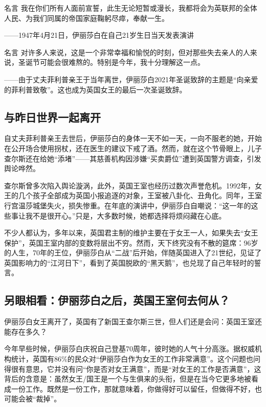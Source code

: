 \begin{quoteBox}{名言}
我在你们所有人面前宣誓，此生无论短暂或漫长，我都将会为英联邦的全体人民、为我们同属的帝国家庭鞠躬尽瘁，奉献一生。

——1947年4月21日，伊丽莎白在自己21岁生日当天发表演讲
\end{quoteBox}

\begin{quoteBox}{名言}
对许多人来说，这是一个非常幸福和愉悦的时刻，但对那些失去亲人的人来说，圣诞节可能会很难熬的。特别是今年，我十分理解这一点。

——由于丈夫菲利普亲王于当年离世，伊丽莎白2021年圣诞致辞的主题是“向亲爱的菲利普致敬”。这也成为英国女王的最后一次圣诞致辞。
\end{quoteBox}

\subsection*{与昨日世界一起离开}

自丈夫菲利普亲王去世后，伊丽莎白的身体一天不如一天，一向不服老的她，开始在公开场合使用拐杖，还在医生的建议下戒了酒。然而，就在这个节骨眼上，儿子查尔斯还在给她“添堵”——其慈善机构因涉嫌“买卖爵位”遭到英国警方调查，引发舆论哗然。

查尔斯曾多次陷入舆论漩涡，此外，英国王室也经历过数次声誉危机。1992年，女王的几个孩子全部成为英国小报追逐的对象，王室被八卦化、丑角化。同年，王室行宫温莎城堡失火，损失惨重。在年底的演讲中，伊丽莎白自嘲说：“这一年的这些事让我不是很开心。”只是，大多数时候，她都选择将烦闷藏在心底。

不少人都认为，多年以来，英国君主制的维护主要在于女王一人，如果失去“女王保护”，英国王室内部的变数将层出不穷。然而，天下终究没有不散的筵席：96岁的人生，70年的王位，伊丽莎白从“二战”后开始，伴随英国进入了21世纪，见证了英国影响力的“江河日下”，看到了英国脱欧的“黑天鹅”，也兑现了自己年轻时的誓言。

\subsection*{另眼相看：伊丽莎白之后，英国王室何去何从？}

伊丽莎白女王离开了，英国有了新国王查尔斯三世，但人们还是会问：英国王室还能存在多久？

今年早些时候，伊丽莎白庆祝自己登基70周年，彼时她的人气十分高涨。据权威机构统计，英国有86\%的民众对“伊丽莎白作为女王的工作非常满意”。这个问题也问得很有意思，它并没有问“你是否对女王满意”，而是“对女王的工作是否满意”，这背后的含意是：虽然女王/国王是一个与生俱来的头衔，但是在当今它更多地被看成一份工作。既然是一份工作，那就意味着，你做得好可以留任，但做得不好，也可能会被“裁掉”。

